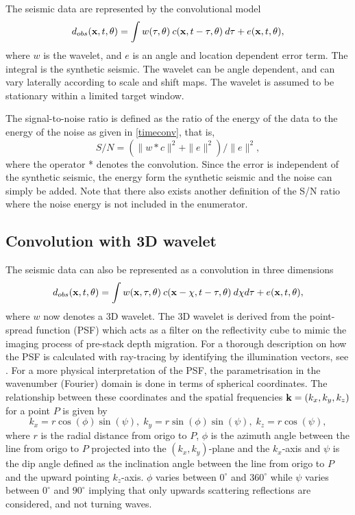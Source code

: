 The seismic data are represented by the convolutional model
%
\begin{equation} \label{timeconv}
   d_{obs}(\mathbf{x},t,\theta)
    =\int w(\tau,\theta) \: c(\mathbf{x},t-\tau,\theta) \: d\tau + e(\mathbf{x},t,\theta),
\end{equation}
%
where $w$ is the wavelet, and $e$ is an angle and location dependent
error term. The integral is the synthetic seismic. The wavelet can be
angle dependent, and can vary laterally according to scale and shift
maps. The wavelet is assumed to be stationary within a limited 
target window. 

The signal-to-noise ratio is defined as the ratio of the energy of the
data to the energy of the noise as given in \autoref{timeconv}, that is, 
%
\begin{equation} \label{SNR}
   S/N =  \left(\| w * c\|^2+\| e\|^2\right) / \| e\|^2,
\end{equation}
%
\noindent
where the operator * denotes the convolution. Since the error is
independent of the synthetic seismic, the energy form the synthetic
seismic and the noise can simply be added. Note that there also exists
another definition of the S/N ratio where the noise energy is not
included in the enumerator.

\subsection{Convolution with 3D wavelet}
The seismic data can also be represented as a convolution in three dimensions 
%
\begin{equation} \label{3Dconv}
   d_{obs}(\mathbf{x},t,\theta)
    =\int w(\mathbf{x},\tau,\theta) \: c(\mathbf{x}-\mathbf{\chi},t-\tau,\theta) \: d\mathbf{\chi}d\tau + e(\mathbf{x},t,\theta),
\end{equation}
where $w$ now denotes a 3D wavelet. The 3D wavelet is derived from the point-spread function (PSF) which acts as a filter on the reflectivity cube to mimic the imaging process of pre-stack depth migration. For a thorough description on how the PSF is calculated with ray-tracing by identifying the illumination vectors, see \cite{lecomte08}. For a more physical interpretation of the PSF, the parametrisation in the wavenumber (Fourier) domain is done in terms of spherical coordinates. The relationship between these coordinates and the spatial frequencies $\mathbf{k}=(k_x,
k_y, k_z)$ for a point $P$ is given by 
\begin{equation}
k_x=r\cos(\phi)\sin(\psi),\; k_y=r\sin(\phi)\sin(\psi),\; k_z=r\cos(\psi), \label{eq:spherical}
\end{equation}
where $r$ is the radial distance from origo to $P$, $\phi$ is the
azimuth angle between the line from origo to $P$ projected into the
$(k_x,k_y)$-plane and the $k_x$-axis and $\psi$ is the dip angle
defined as the inclination angle between the line from origo to $P$
and the upward pointing $k_z$-axis. $\phi$ varies between $0^{\circ}$
and $360^{\circ}$ while $\psi$ varies between $0^{\circ}$ and
$90^{\circ}$ implying that only upwards scattering reflections are
considered, and not turning waves. 

